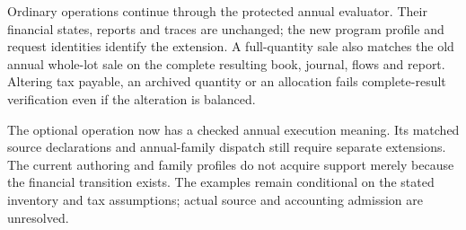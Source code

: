 Ordinary operations continue through the protected annual evaluator. Their
financial states, reports and traces are unchanged; the new program profile
and request identities identify the extension. A full-quantity sale also
matches the old annual whole-lot sale on the complete resulting book, journal,
flows and report. Altering tax payable, an archived quantity or an allocation
fails complete-result verification even if the alteration is balanced.

The optional operation now has a checked annual execution meaning. Its matched
source declarations and annual-family dispatch still require separate
extensions. The current authoring and family profiles do not acquire support
merely because the financial transition exists. The examples remain conditional
on the stated inventory and tax assumptions; actual source and accounting
admission are unresolved.
